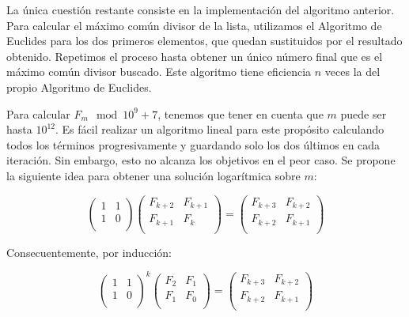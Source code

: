 \documentclass{article}
\theoremstyle{theorem-style}  %
\theoremstyle{definition}
\theoremstyle{example-style}
\begin{document}
    La única cuestión restante consiste en la implementación del algoritmo anterior. Para calcular el máximo común divisor de la lista, utilizamos el Algoritmo de Euclides para los dos primeros elementos, que quedan sustituidos por el resultado obtenido. Repetimos el proceso hasta obtener un único número final que es el máximo común divisor buscado. Este algoritmo tiene eficiencia $n$ veces la del propio Algoritmo de Euclides. 
    
    Para calcular $F_m \mod 10^9+7$, tenemos que tener en cuenta que $m$ puede ser hasta $10^{12}$. Es fácil realizar un algoritmo lineal para este propósito calculando todos los términos progresivamente y guardando solo los dos últimos en cada iteración. Sin embargo, esto no alcanza los objetivos en el peor caso. Se propone la siguiente idea para obtener una solución logarítmica sobre $m$:
    
    \begin{equation}
        \begin{pmatrix}
            1 & 1 \\
            1 & 0 \\
        \end{pmatrix}
        \begin{pmatrix}
            F_{k+2} & F_{k+1} \\
            F_{k+1} & F_{k} \\
        \end{pmatrix}
        =
        \begin{pmatrix}
            F_{k+3} & F_{k+2} \\
            F_{k+2} & F_{k+1} \\
        \end{pmatrix}        
    \end{equation}
    
    Consecuentemente, por inducción:
    
    \begin{equation}
        \begin{pmatrix}
            1 & 1 \\
            1 & 0 \\
        \end{pmatrix}^k
        \begin{pmatrix}
            F_{2} & F_{1} \\
            F_{1} & F_{0} \\
        \end{pmatrix}
        =
        \begin{pmatrix}
            F_{k+3} & F_{k+2} \\
            F_{k+2} & F_{k+1} \\
        \end{pmatrix}        
    \end{equation}
    
\end{document}
